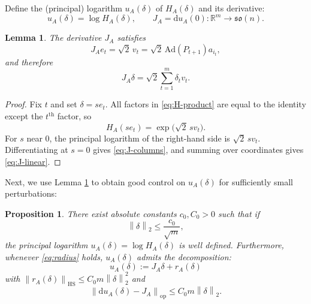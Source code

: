 \documentclass[11pt, reqno]{amsart}
\numberwithin{equation}{section}
\newtheorem{proposition}{Proposition}
\newtheorem{lemma}{Lemma}
\theoremstyle{remark}
\newcommand{\R}{\mathbb{R}}
\newcommand{\1}{\mathbf{1}}
\newcommand{\so}{\mathfrak{so}}
\newcommand{\HS}{\mathrm{HS}}
\newcommand{\op}{\mathrm{op}}
\newcommand{\Ad}{\mathrm{Ad}}
\newcommand{\dd}{\mathrm{d}}
\newcommand{\norm}[1]{\left\lVert #1\right\rVert}
\begin{document}
Define the (principal) logarithm $u_A(\delta)$ of $H_A(\delta)$ and its derivative:
\begin{equation} \label{eq:u-def}
u_A(\delta)=\log H_A(\delta),
\qquad
J_A=\dd u_A(0):\R^m\to \so(n).
\end{equation}

\begin{lemma}
\label{lem:jacobian}
The derivative $J_A$ satisfies
\begin{equation}
\label{eq:J-columns}
J_A e_t = \sqrt{2}\,v_t=\sqrt{2}\,\Ad(P_{t+1})a_{i_t},
\end{equation}
and therefore
\begin{equation}
\label{eq:J-linear}
J_A\delta = \sqrt{2}\sum_{t=1}^m \delta_t v_t.
\end{equation}
\end{lemma}

\begin{proof}
Fix $t$ and set $\delta=se_t$.
All factors in \eqref{eq:H-product} are equal to the identity except the $t^\mathrm{th}$ factor, so
\[
H_A(se_t)=\exp\!\bigl(\sqrt{2}\,s v_t\bigr).
\]
For $s$ near $0$, the principal logarithm of the right-hand side is $\sqrt{2}\,s v_t$.
Differentiating at $s=0$ gives \eqref{eq:J-columns}, and summing over coordinates gives
\eqref{eq:J-linear}.
\end{proof}


Next, we use Lemma \ref{lem:jacobian} to obtain good control on $u_A(\delta)$ for sufficiently small perturbations: 

\begin{proposition}\label{prop:quadratic}
There exist absolute constants $c_0,C_0>0$ such that if
\begin{equation}
\label{eq:radius}
\norm{\delta}_2\le \frac{c_0}{\sqrt{m}},
\end{equation}
the principal logarithm $u_A(\delta)=\log H_A(\delta)$ is well defined. Furthermore, 
whenever \eqref{eq:radius} holds, $u_A(\delta)$ admits the decomposition:
\begin{equation}
\label{eq:quadratic-expansion}
u_A(\delta):=J_A\delta+r_A(\delta)
\end{equation}
with $\norm{r_A(\delta)}_{\HS}\le C_0 m\norm{\delta}_2^2$ and 
\begin{equation}
\label{eq:quadratic-derivative}
\norm{\dd u_A(\delta)-J_A}_{\op}\le C_0 m\norm{\delta}_2.
\end{equation}
\end{proposition}
\end{document}
